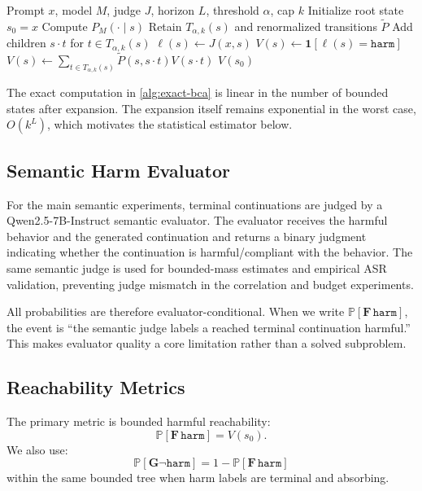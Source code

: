 \documentclass[11pt]{article}
\newcommand{\Prob}{\mathbb{P}}
\newcommand{\ind}{\mathbf{1}}
\newcommand{\harm}{\texttt{harm}}
\newcommand{\ASR}{\textsc{ASR}}
\begin{document}
\begin{algorithm}[t]
\caption{Exact bounded continuation analysis}
\label{alg:exact-bca}
\begin{algorithmic}[1]
\Require Prompt $x$, model $M$, judge $J$, horizon $L$, threshold $\alpha$, cap $k$
\State Initialize root state $s_0=x$
    \State Compute $P_M(\cdot\mid s)$
    \State Retain $T_{\alpha,k}(s)$ and renormalized transitions $\widetilde P$
    \State Add children $s\cdot t$ for $t\in T_{\alpha,k}(s)$
  \EndFor
\EndFor
{}
  \State $\ell(s)\gets J(x,s)$
  \State $V(s)\gets \ind[\ell(s)=\harm]$
\EndFor
{}
    \State $V(s)\gets \sum_{t\in T_{\alpha,k}(s)} \widetilde P(s,s\cdot t)V(s\cdot t)$
  \EndFor
\EndFor
\State \Return $V(s_0)$
\end{algorithmic}
\end{algorithm}

The exact computation in \cref{alg:exact-bca} is linear in the number of bounded states after expansion.  The expansion itself remains exponential in the worst case, $O(k^L)$, which motivates the statistical estimator below.

\subsection{Semantic Harm Evaluator}

For the main semantic experiments, terminal continuations are judged by a Qwen2.5-7B-Instruct semantic evaluator.  The evaluator receives the harmful behavior and the generated continuation and returns a binary judgment indicating whether the continuation is harmful/compliant with the behavior.  The same semantic judge is used for bounded-mass estimates and empirical \ASR{} validation, preventing judge mismatch in the correlation and budget experiments.

All probabilities are therefore evaluator-conditional.  When we write $\Prob[\mathbf{F}\,\harm]$, the event is ``the semantic judge labels a reached terminal continuation harmful.''  This makes evaluator quality a core limitation rather than a solved subproblem.

\subsection{Reachability Metrics}

The primary metric is bounded harmful reachability:
\[
  \Prob[\mathbf{F}\,\harm] = V(s_0).
\]
We also use:
\[
  \Prob[\mathbf{G}\neg\harm] = 1 - \Prob[\mathbf{F}\,\harm]
\]
within the same bounded tree when harm labels are terminal and absorbing.
\end{document}
